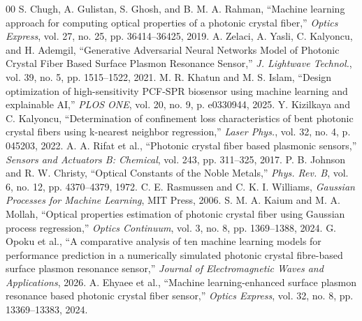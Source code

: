 \documentclass[conference]{IEEEtran}
\begin{document}
\small
\begin{thebibliography}{00}
 S. Chugh, A. Gulistan, S. Ghosh, and B. M. A. Rahman, ``Machine learning approach for computing optical properties of a photonic crystal fiber,'' \textit{Optics Express}, vol. 27, no. 25, pp. 36414--36425, 2019.
 A. Zelaci, A. Yasli, C. Kalyoncu, and H. Ademgil, ``Generative Adversarial Neural Networks Model of Photonic Crystal Fiber Based Surface Plasmon Resonance Sensor,'' \textit{J. Lightwave Technol.}, vol. 39, no. 5, pp. 1515--1522, 2021.
 M. R. Khatun and M. S. Islam, ``Design optimization of high-sensitivity PCF-SPR biosensor using machine learning and explainable AI,'' \textit{PLOS ONE}, vol. 20, no. 9, p. e0330944, 2025.
 Y. Kizilkaya and C. Kalyoncu, ``Determination of confinement loss characteristics of bent photonic crystal fibers using k-nearest neighbor regression,'' \textit{Laser Phys.}, vol. 32, no. 4, p. 045203, 2022.
 A. A. Rifat et al., ``Photonic crystal fiber based plasmonic sensors,'' \textit{Sensors and Actuators B: Chemical}, vol. 243, pp. 311--325, 2017.
 P. B. Johnson and R. W. Christy, ``Optical Constants of the Noble Metals,'' \textit{Phys. Rev. B}, vol. 6, no. 12, pp. 4370--4379, 1972.
 C. E. Rasmussen and C. K. I. Williams, \textit{Gaussian Processes for Machine Learning}, MIT Press, 2006.
 S. M. A. Kaium and M. A. Mollah, ``Optical properties estimation of photonic crystal fiber using Gaussian process regression,'' \textit{Optics Continuum}, vol. 3, no. 8, pp. 1369--1388, 2024.
 G. Opoku et al., ``A comparative analysis of ten machine learning models for performance prediction in a numerically simulated photonic crystal fibre-based surface plasmon resonance sensor,'' \textit{Journal of Electromagnetic Waves and Applications}, 2026.
 A. Ehyaee et al., ``Machine learning-enhanced surface plasmon resonance based photonic crystal fiber sensor,'' \textit{Optics Express}, vol. 32, no. 8, pp. 13369--13383, 2024.
\end{thebibliography}
\end{document}
